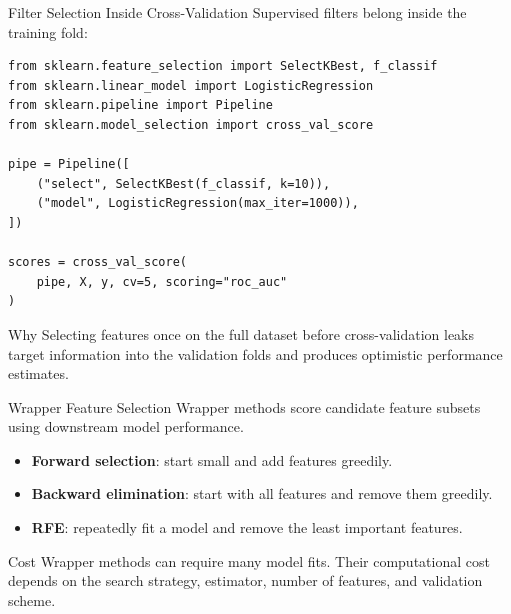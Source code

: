 \documentclass[aspectratio=169,11pt]{beamer}
\begin{document}
\begin{frame}[fragile]{Filter Selection Inside Cross-Validation}
Supervised filters belong inside the training fold:

\begin{lstlisting}[style=code,basicstyle=\ttfamily\small]
from sklearn.feature_selection import SelectKBest, f_classif
from sklearn.linear_model import LogisticRegression
from sklearn.pipeline import Pipeline
from sklearn.model_selection import cross_val_score

pipe = Pipeline([
    ("select", SelectKBest(f_classif, k=10)),
    ("model", LogisticRegression(max_iter=1000)),
])

scores = cross_val_score(
    pipe, X, y, cv=5, scoring="roc_auc"
)
\end{lstlisting}

\begin{block}{Why}
Selecting features once on the full dataset before cross-validation leaks target information into the validation folds and produces optimistic performance estimates.
\end{block}
\end{frame}

\begin{frame}{Wrapper Feature Selection}
Wrapper methods score candidate feature subsets using downstream model performance.

\begin{itemize}
  \item \textbf{Forward selection}: start small and add features greedily.
  \item \textbf{Backward elimination}: start with all features and remove them greedily.
  \item \textbf{RFE}: repeatedly fit a model and remove the least important features.
\end{itemize}

\begin{alertblock}{Cost}
Wrapper methods can require many model fits. Their computational cost depends on the search strategy, estimator, number of features, and validation scheme.
\end{alertblock}
\end{frame}
\end{document}

